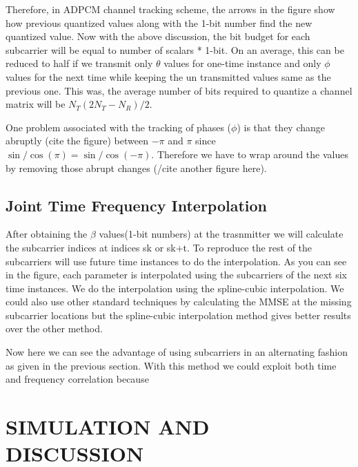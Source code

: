 \documentclass[conference]{IEEEtran}
\begin{document}
Therefore, in ADPCM channel tracking scheme, the arrows in the figure show how previous quantized values along with the 1-bit number find the new quantized value. Now with the above discussion, the bit budget for each subcarrier will be equal to number of scalars * 1-bit. On an average, this can be reduced to half if we transmit only $\theta$ values for one-time instance and only $\phi$ values for the next time while keeping the un transmitted values same as the previous one. This was, the average number of bits required to quantize a channel matrix will be $N_{T}(2N_{T} - N_{R})/2$. 

One problem associated with the tracking of phases ($\phi$) is that they change abruptly (cite the figure) between $-\pi$ and $\pi$ since $\sin/\cos(\pi) =\sin/\cos(-\pi)$. Therefore we have to wrap around the values by removing those abrupt changes (/cite another figure here). 


\subsection{Joint Time Frequency Interpolation} 
\label{interp} 

After obtaining the $\beta$ values(1-bit numbers) at the trasnmitter we will calculate the subcarrier indices at indices sk or sk+t. To reproduce the rest of the subcarriers will use future time instances to do the interpolation. As you can see in the figure, each parameter is interpolated using the subcarriers of the next six time instances. We do the interpolation using the spline-cubic interpolation. We could also use other standard techniques by calculating the MMSE at the missing subcarrier locations but the spline-cubic interpolation method gives better results over the other method. 

Now here we can see the advantage of using subcarriers in an alternating fashion as given in the previous section. With this method we could exploit both time and frequency correlation because 


\section{SIMULATION AND DISCUSSION} 
\label{section3}
\end{document}
